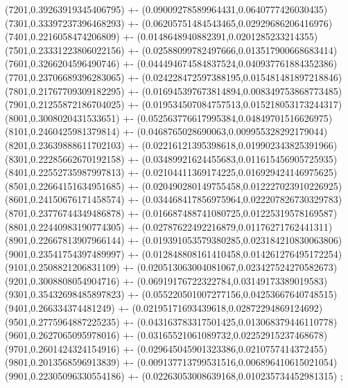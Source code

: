{(7201,0.39263919345406795) +- (0.09009278589964431,0.0640777426030435)
(7301,0.33397237396468293) +- (0.06205751484543465,0.02929686206416976)
(7401,0.2216058474206809) +- (0.0148648940882391,0.0201285233214355)
(7501,0.23331223806022156) +- (0.02588099782497666,0.013517900668683414)
(7601,0.3266204596490746) +- (0.044494674584837524,0.040937761884352386)
(7701,0.23706689396283065) +- (0.024228472597388195,0.015481481897218846)
(7801,0.21767709309182295) +- (0.016945397673814894,0.008349753868773485)
(7901,0.21255872186704025) +- (0.019534507084757513,0.015218053173244317)
(8001,0.3008020431533651) +- (0.052563776617995384,0.04849701516626975)
(8101,0.2460425981379814) +- (0.0468765028690063,0.009955328292179044)
(8201,0.23639888611702103) +- (0.02216121395398618,0.019902343825391966)
(8301,0.22285662670192158) +- (0.03489921624455683,0.011615456905725935)
(8401,0.22552735987997813) +- (0.02104411369174225,0.016929424146975625)
(8501,0.22664151634951685) +- (0.020490280149755458,0.012227023910226925)
(8601,0.24150676171458574) +- (0.034468417856975964,0.022207826730329783)
(8701,0.23776744349486878) +- (0.016687488741080725,0.01225319578169587)
(8801,0.22440983190774305) +- (0.02787622492216879,0.01176271762441311)
(8901,0.22667813907966144) +- (0.019391053579380285,0.023184210830063806)
(9001,0.23541754397489997) +- (0.012848808161410458,0.014261276495172254)
(9101,0.2508821206831109) +- (0.020513063004081067,0.023427524270582673)
(9201,0.3008808054904716) +- (0.06919176722322784,0.03149173389019583)
(9301,0.35432698485897823) +- (0.055220501007277156,0.04253667640748515)
(9401,0.266334374481249) +- (0.02195171693439618,0.02872294869124692)
(9501,0.2775964887225235) +- (0.043163783317501425,0.013068379446110778)
(9601,0.2627065095978016) +- (0.03165521061089732,0.02252915237468678)
(9701,0.2601424324154916) +- (0.029645045901323386,0.0210757414372455)
(9801,0.2013568596913839) +- (0.009137713799531516,0.006896410615021054)
(9901,0.22305096330554186) +- (0.02263053008639168,0.010235734452981315)
};

